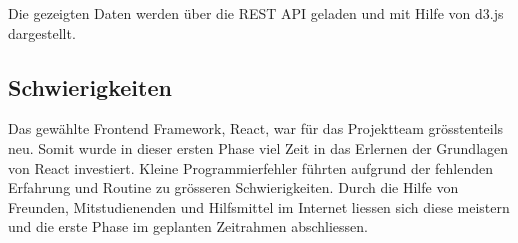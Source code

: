 Die gezeigten Daten werden über die \ac{REST} \ac{API} geladen und mit Hilfe von d3.js dargestellt.


\subsection{Schwierigkeiten}
Das gewählte Frontend Framework, React, war für das Projektteam grösstenteils neu.
Somit wurde in dieser ersten Phase viel Zeit in das Erlernen der Grundlagen von React investiert.
Kleine Programmierfehler führten aufgrund der fehlenden Erfahrung und Routine zu grösseren Schwierigkeiten.
Durch die Hilfe von Freunden, Mitstudienenden und Hilfsmittel im Internet liessen sich diese meistern
und die erste Phase im geplanten Zeitrahmen abschliessen.
